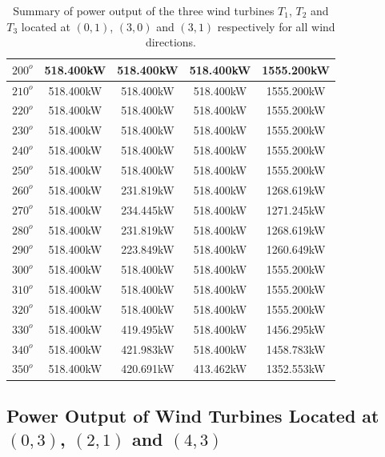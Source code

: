 \begin{table}[H]
\begin{tabular}{|c|c|c|c|c|}
	     \hline
	     $200^{o}$ & 518.400kW & 518.400kW & 518.400kW & 1555.200kW \\
	     \hline
	     $210^{o}$ & 518.400kW & 518.400kW & 518.400kW & 1555.200kW \\
	     \hline
	     $220^{o}$ & 518.400kW & 518.400kW & 518.400kW & 1555.200kW \\
	     \hline
	     $230^{o}$ & 518.400kW & 518.400kW & 518.400kW & 1555.200kW \\
	     \hline
	     $240^{o}$ & 518.400kW & 518.400kW & 518.400kW & 1555.200kW \\
	     \hline
	     $250^{o}$ & 518.400kW & 518.400kW & 518.400kW & 1555.200kW \\
	     \hline
	     $260^{o}$ & 518.400kW & 231.819kW & 518.400kW & 1268.619kW \\
	     \hline
	     $270^{o}$ & 518.400kW & 234.445kW & 518.400kW & 1271.245kW \\
	     \hline
	     $280^{o}$ & 518.400kW & 231.819kW & 518.400kW & 1268.619kW \\
	     \hline
	     $290^{o}$ & 518.400kW & 223.849kW & 518.400kW & 1260.649kW \\
	     \hline
	     $300^{o}$ & 518.400kW & 518.400kW & 518.400kW & 1555.200kW \\
	     \hline
	     $310^{o}$ & 518.400kW & 518.400kW & 518.400kW & 1555.200kW \\
	     \hline
	     $320^{o}$ & 518.400kW & 518.400kW & 518.400kW & 1555.200kW \\
	     \hline
	     $330^{o}$ & 518.400kW & 419.495kW & 518.400kW & 1456.295kW \\
	     \hline
	     $340^{o}$ & 518.400kW & 421.983kW & 518.400kW & 1458.783kW \\
	     \hline
	     $350^{o}$ & 518.400kW & 420.691kW & 413.462kW & 1352.553kW \\
	     \hline
	    \end{tabular}
	    \caption{Summary of power output of the three wind turbines $T_1$, $T_2$ and $T_3$ located at $(0,1)$, $(3,0)$ and $(3,1)$ respectively for all wind directions.}
	    \label{summaryRandom1-3b}
	\end{table}
	\doublespacing
	

\subsection{Power Output of Wind Turbines Located at $(0,3)$, $(2,1)$ and $(4,3)$}
	
